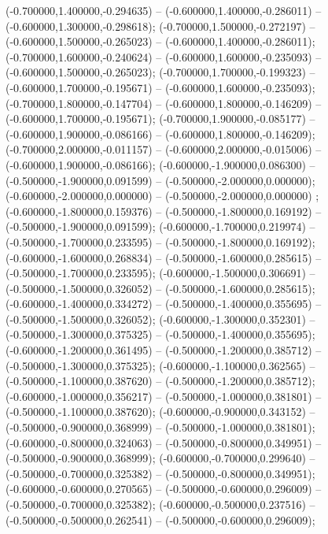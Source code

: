  (-0.700000,1.400000,-0.294635) -- (-0.600000,1.400000,-0.286011) -- (-0.600000,1.300000,-0.298618);
 (-0.700000,1.500000,-0.272197) -- (-0.600000,1.500000,-0.265023) -- (-0.600000,1.400000,-0.286011);
 (-0.700000,1.600000,-0.240624) -- (-0.600000,1.600000,-0.235093) -- (-0.600000,1.500000,-0.265023);
 (-0.700000,1.700000,-0.199323) -- (-0.600000,1.700000,-0.195671) -- (-0.600000,1.600000,-0.235093);
 (-0.700000,1.800000,-0.147704) -- (-0.600000,1.800000,-0.146209) -- (-0.600000,1.700000,-0.195671);
 (-0.700000,1.900000,-0.085177) -- (-0.600000,1.900000,-0.086166) -- (-0.600000,1.800000,-0.146209);
 (-0.700000,2.000000,-0.011157) -- (-0.600000,2.000000,-0.015006) -- (-0.600000,1.900000,-0.086166);
 (-0.600000,-1.900000,0.086300) -- (-0.500000,-1.900000,0.091599) -- (-0.500000,-2.000000,0.000000);
 (-0.600000,-2.000000,0.000000) -- (-0.500000,-2.000000,0.000000) ;
 (-0.600000,-1.800000,0.159376) -- (-0.500000,-1.800000,0.169192) -- (-0.500000,-1.900000,0.091599);
 (-0.600000,-1.700000,0.219974) -- (-0.500000,-1.700000,0.233595) -- (-0.500000,-1.800000,0.169192);
 (-0.600000,-1.600000,0.268834) -- (-0.500000,-1.600000,0.285615) -- (-0.500000,-1.700000,0.233595);
 (-0.600000,-1.500000,0.306691) -- (-0.500000,-1.500000,0.326052) -- (-0.500000,-1.600000,0.285615);
 (-0.600000,-1.400000,0.334272) -- (-0.500000,-1.400000,0.355695) -- (-0.500000,-1.500000,0.326052);
 (-0.600000,-1.300000,0.352301) -- (-0.500000,-1.300000,0.375325) -- (-0.500000,-1.400000,0.355695);
 (-0.600000,-1.200000,0.361495) -- (-0.500000,-1.200000,0.385712) -- (-0.500000,-1.300000,0.375325);
 (-0.600000,-1.100000,0.362565) -- (-0.500000,-1.100000,0.387620) -- (-0.500000,-1.200000,0.385712);
 (-0.600000,-1.000000,0.356217) -- (-0.500000,-1.000000,0.381801) -- (-0.500000,-1.100000,0.387620);
 (-0.600000,-0.900000,0.343152) -- (-0.500000,-0.900000,0.368999) -- (-0.500000,-1.000000,0.381801);
 (-0.600000,-0.800000,0.324063) -- (-0.500000,-0.800000,0.349951) -- (-0.500000,-0.900000,0.368999);
 (-0.600000,-0.700000,0.299640) -- (-0.500000,-0.700000,0.325382) -- (-0.500000,-0.800000,0.349951);
 (-0.600000,-0.600000,0.270565) -- (-0.500000,-0.600000,0.296009) -- (-0.500000,-0.700000,0.325382);
 (-0.600000,-0.500000,0.237516) -- (-0.500000,-0.500000,0.262541) -- (-0.500000,-0.600000,0.296009);
